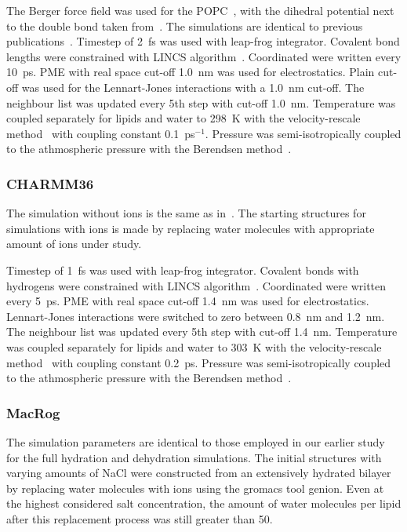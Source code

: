 \documentclass[pre,aps,floatfix,authordate1-4,twocolumn]{revtex4-1}
\begin{document}
The Berger force field was used for the POPC~\cite{berger97}, with the dihedral potential next to the double bond 
taken from~\cite{bachar04}. The simulations are identical to previous publications~\cite{ollila07a,ferreira13,ferreira15}.
Timestep of 2~fs was used with leap-frog integrator. Covalent bond lengths were constrained with LINCS algorithm~\cite{hess97,hess07}. 
Coordinated were written every 10~ps. PME with real space cut-off 1.0~nm was used 
for electrostatics. Plain cut-off was used for the Lennart-Jones interactions with a 1.0~nm cut-off.
The neighbour list was updated every 5th step with cut-off 1.0~nm. Temperature was coupled separately
for lipids and water to 298~K with the velocity-rescale method~\cite{bussi07} with coupling constant 0.1~ps$^{-1}$.
Pressure was semi-isotropically coupled to the athmospheric pressure with the Berendsen method~\cite{berendsen84}.


\subsubsection{CHARMM36}
The simulation without ions is the same as in~\cite{botan15}. The starting structures for simulations with ions is
made by replacing water molecules with appropriate amount of ions under study.

Timestep of 1~fs was used with leap-frog integrator. Covalent bonds with hydrogens were constrained with LINCS algorithm~\cite{hess97,hess07}. 
Coordinated were written every 5~ps. PME with real space cut-off 1.4~nm was used 
for electrostatics. Lennart-Jones interactions were switched to zero between 0.8~nm and 1.2~nm.
The neighbour list was updated every 5th step with cut-off 1.4~nm. Temperature was coupled separately
for lipids and water to 303~K with the velocity-rescale method~\cite{bussi07} with coupling constant 0.2~ps.
Pressure was semi-isotropically coupled to the athmospheric pressure with the Berendsen method~\cite{berendsen84}.

\subsubsection{MacRog}
The simulation parameters are identical to those employed in our earlier study~\cite{botan15} for the full 
hydration and dehydration simulations. The initial structures with varying amounts of NaCl were constructed from an 
extensively hydrated bilayer by replacing water molecules with ions using the gromacs tool genion. Even at the highest 
considered salt concentration, the amount of water molecules per lipid after this replacement process was still greater than 50.
\end{document}
